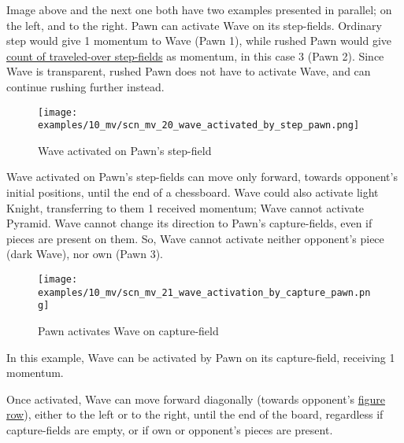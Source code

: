 \vspace*{-0.5\baselineskip}
Image above and the next one both have two examples presented in parallel; on the
left, and to the right. \newline
\indent
Pawn can activate Wave on its step-fields. Ordinary step would give 1 momentum to
Wave (Pawn 1), while rushed Pawn would give
\hyperref[sec:Mayan Ascendancy/Pyramid/Momentum/Fields counting]{count of traveled-over step-fields}
as momentum, in this case 3 (Pawn 2). Since Wave is transparent, rushed Pawn does
not have to activate Wave, and can continue rushing further instead.

\clearpage %

\vspace*{-2.1\baselineskip}
\noindent
\begin{figure}[!h]
\texttt{[image: examples/10\_mv/scn\_mv\_20\_wave\_activated\_by\_step\_pawn.png]}
\caption{Wave activated on Pawn's step-field}
\label{fig:scn_mv_20_wave_activated_by_step_pawn}
\end{figure}

Wave activated on Pawn's step-fields can move only forward, towards opponent's
initial positions, until the end of a chessboard. Wave could also activate light
Knight, transferring to them 1 received momentum; Wave cannot activate Pyramid.
Wave cannot change its direction to Pawn's capture-fields, even if pieces are
present on them. So, Wave cannot activate neither opponent's piece (dark Wave),
nor own (Pawn 3).

\clearpage %

\vspace*{-2.1\baselineskip}
\noindent
\begin{figure}[!h]
\texttt{[image: examples/10\_mv/scn\_mv\_21\_wave\_activation\_by\_capture\_pawn.png]}
\caption{Pawn activates Wave on capture-field}
\label{fig:scn_mv_21_wave_activation_by_capture_pawn}
\end{figure}

In this example, Wave can be activated by Pawn on its capture-field, receiving 1 momentum.

Once activated, Wave can move forward diagonally (towards opponent's
\hyperref[sec:Terms/Figure row]{figure row}), either to the left or to the right, until the
end of the board, regardless if capture-fields are empty, or if own or opponent's pieces are
present.

